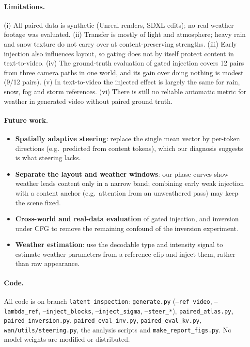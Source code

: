 \documentclass[11pt,a4paper]{article}
\begin{document}
\paragraph{Limitations.}
(i) All paired data is synthetic (Unreal renders, SDXL edits); no real weather footage was evaluated.
(ii) Transfer is mostly of light and atmosphere; heavy rain and snow texture do not carry over at content-preserving strengths.
(iii) Early injection also influences layout, so gating does not by itself protect content in text-to-video.
(iv) The ground-truth evaluation of gated injection covers 12 pairs from three camera paths in one world, and its gain over doing nothing is modest (9/12 pairs). (v) In text-to-video the injected effect is largely the same for rain, snow, fog and storm references.
(vi) There is still no reliable automatic metric for weather in generated video without paired ground truth.

\paragraph{Future work.}
\begin{itemize}
  \item \textbf{Spatially adaptive steering}: replace the single mean vector by per-token directions (e.g.\ predicted from content tokens), which our diagnosis suggests is what steering lacks.
  \item \textbf{Separate the layout and weather windows}: our phase curves show weather leads content only in a narrow band; combining early weak injection with a content anchor (e.g.\ attention from an unweathered pass) may keep the scene fixed.
  \item \textbf{Cross-world and real-data evaluation} of gated injection, and inversion under CFG to remove the remaining confound of the inversion experiment.
  \item \textbf{Weather estimation}: use the decodable type and intensity signal to estimate weather parameters from a reference clip and inject them, rather than raw appearance.
\end{itemize}

\paragraph{Code.}
{\sloppy All code is on branch \texttt{latent\_inspection}: \texttt{generate.py} (\texttt{--ref\_video}, \texttt{--lambda\_ref}, \texttt{--inject\_blocks}, \texttt{--inject\_sigma}, \texttt{--steer\_*}), \texttt{paired\_atlas.py}, \texttt{paired\_inversion.py}, \texttt{paired\_eval\_inv.py}, \texttt{paired\_eval\_kv.py}, \texttt{wan/utils/steering.py}, the analysis scripts and \texttt{make\_report\_figs.py}. No model weights are modified or distributed.\par}



\end{document}
